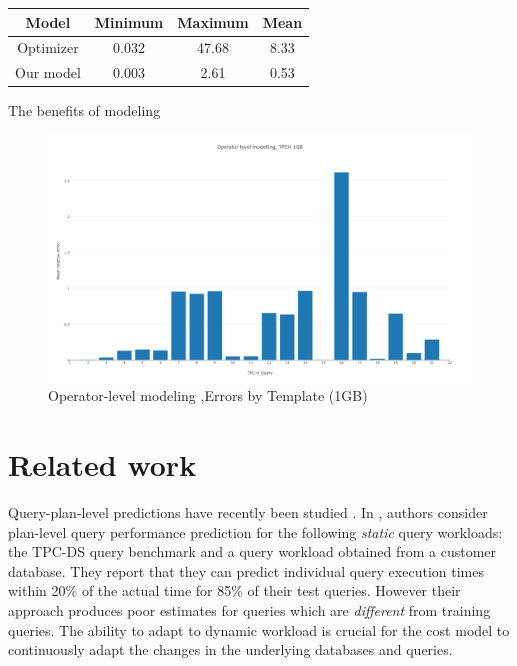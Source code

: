 \documentclass{article}
\begin{document}
\begin{multicols}{2}
	\begin{center}
	\begin{tabular}{ |c|c|c|c| } 
	\hline
	  Model & Minimum & Maximum & Mean\\ [0.5ex] 
	 \hline
	 Optimizer & 0.032  & 47.68 & 8.33 \\
	 Our model & 0.003 & 2.61 & 0.53 \\
	 \hline
	\end{tabular}
	\end{center}
	
	The benefits of modeling 
	
	\begin{figure}[!t]
	  \includegraphics[width=\textwidth]{tpch-1gbres.png}
	  \caption{Operator-level modeling ,Errors by Template (1GB)}
	\end{figure}


	\section {Related work}
	Query-plan-level predictions have recently been studied \cite{ganapathi}. In \cite{ganapathi},
	authors consider plan-level query performance prediction for the
	following \textit{static} query workloads: the TPC-DS query benchmark
	and a query workload obtained from a customer database. They
	report that they can predict individual query execution times within
	20\% of the actual time for 85\% of their test queries.	However their approach produces
	poor estimates for queries which are \textit{different} from training queries. The ability to 
	adapt to dynamic workload is crucial for the cost model to continuously adapt the changes in the
	underlying databases and queries.
	

\end{multicols}
\end{document}
